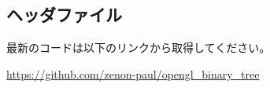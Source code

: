 \documentclass{ltjsarticle}
\begin{document}










\subsection{ヘッダファイル}















最新のコードは以下のリンクから取得してください。

\url{https://github.com/zenon-paul/opengl_binary_tree}
\end{document}
